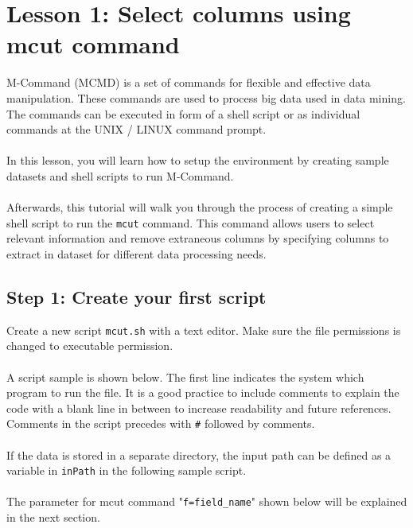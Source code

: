 

%

\section{Lesson 1: Select columns using mcut command}

{M-Command (MCMD) is a set of commands for flexible and effective data manipulation. These commands are used to process big data used in data mining.  The commands can be executed in form of a shell script or as individual commands at the UNIX / LINUX command prompt. 
\\ 
\\
In this lesson, you will learn how to setup the environment by creating sample datasets and shell scripts to run M-Command.
\\
\\
Afterwards, this tutorial will walk you through the process of creating a simple shell script to run the \verb|mcut| command. This command allows users to select relevant information and remove extraneous columns by specifying columns to extract in dataset for different data processing needs.  }

\subsection{Step 1: Create your first script}

\noindent Create a new script \verb|mcut.sh| with a text editor. Make sure the file permissions is changed to executable permission. 
\\
\\
A script sample is shown below. The first line indicates the system which program to run the file. 
It is a good practice to include comments to explain the code with a blank line in between to increase readability and future references. Comments in the script precedes with \verb|#| followed by comments.   
\\
\\
If the data is stored in a separate directory, the input path can be defined as a variable in \verb|inPath| in the following sample script.  
\\
\\
The parameter for mcut command "\verb|f=field_name|" shown below will be explained in the next section. 

